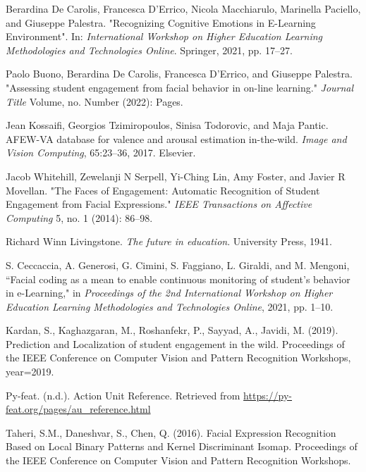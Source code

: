 \begin{thebibliography}{9}
    
    Berardina De Carolis, Francesca D’Errico, Nicola Macchiarulo, Marinella Paciello, and Giuseppe Palestra. 
    "Recognizing Cognitive Emotions in E-Learning Environment". In: 
    \textit{International Workshop on Higher Education Learning Methodologies and Technologies Online}. Springer, 2021, pp. 17--27.
    
    Paolo Buono, Berardina De Carolis, Francesca D'Errico, and Giuseppe Palestra.
    "Assessing student engagement from facial behavior in on-line learning."
    \textit{Journal Title} Volume, no. Number (2022): Pages.
    
    Jean Kossaifi, Georgios Tzimiropoulos, Sinisa Todorovic, and Maja Pantic.
    AFEW-VA database for valence and arousal estimation in-the-wild.
    \textit{Image and Vision Computing}, 65:23--36, 2017. Elsevier.
    
    Jacob Whitehill, Zewelanji N Serpell, Yi-Ching Lin, Amy Foster, and Javier R Movellan. 
    "The Faces of Engagement: Automatic Recognition of Student Engagement from Facial Expressions." 
    \textit{IEEE Transactions on Affective Computing} 5, no. 1 (2014): 86--98.
    
    Richard Winn Livingstone.
    \textit{The future in education}. University Press, 1941.
    
    S. Ceccaccia, A. Generosi, G. Cimini, S. Faggiano, L. Giraldi, and M. Mengoni, 
    ``Facial coding as a mean to enable continuous monitoring of student's behavior in e-Learning," in 
    \textit{Proceedings of the 2nd International Workshop on Higher Education Learning Methodologies and Technologies Online}, 2021, pp. 1--10.
    
    Kardan, S., Kaghazgaran, M., Roshanfekr, P., Sayyad, A., Javidi, M. (2019). 
    Prediction and Localization of student engagement in the wild. Proceedings of the IEEE Conference on Computer Vision and Pattern Recognition Workshops,
    year={2019}.
    
    Py-feat. (n.d.). Action Unit Reference. Retrieved from \url{https://py-feat.org/pages/au_reference.html}
    
    Taheri, S.M., Daneshvar, S., Chen, Q. (2016). 
    Facial Expression Recognition Based on Local Binary Patterns and Kernel Discriminant Isomap. 
    Proceedings of the IEEE Conference on Computer Vision and Pattern Recognition Workshops.
    

\end{thebibliography}
